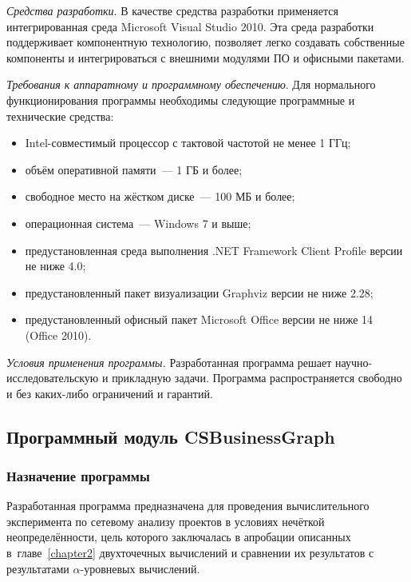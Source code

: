 \textit{Средства разработки}. В качестве средства разработки применяется интегрированная среда Microsoft Visual Studio 2010. Эта среда разработки поддерживает компонентную технологию, позволяет легко создавать собственные компоненты и интегрироваться с внешними модулями ПО и офисными пакетами.

\textit{Требования к аппаратному и программному обеспечению}. Для нормального функционирования программы необходимы следующие программные и технические средства:
\begin{itemize}
  \item Intel-совместимый процессор с тактовой частотой не менее 1 ГГц;
  \item объём оперативной памяти~--- 1 ГБ и более;
  \item свободное место на жёстком диске~--- 100 МБ и более;
  \item операционная система~--- Windows 7 и выше;
  \item предустановленная среда выполнения .NET Framework Client Profile версии не ниже 4.0;
  \item предустановленный пакет визуализации Graphviz версии не ниже 2.28;
  \item предустановленный офисный пакет Microsoft Office версии не ниже 14 (Office 2010).
\end{itemize}

\textit{Условия применения программы.} Разработанная программа решает научно-исследовательскую и прикладную задачи. Программа распространяется свободно и без каких-либо ограничений и гарантий.

\subsection{Программный модуль CSBusinessGraph}

\subsubsection*{Назначение программы}

Разработанная программа предназначена для проведения вычислительного эксперимента по сетевому анализу проектов в условиях нечёткой неопределённости, цель которого заключалась в апробации описанных в~главе~\ref{chapter2} двухточечных вычислений и сравнении их результатов с результатами $\alpha$-уровневых вычислений.

